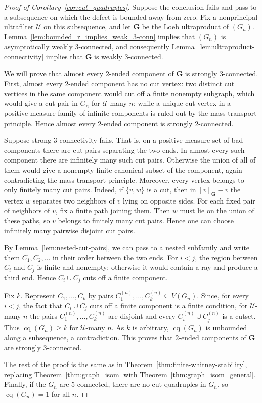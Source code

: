 \documentclass{article}
\theoremstyle{plain}
\theoremstyle{definition}
\begin{document}
\begin{proof}[Proof of Corollary~\ref{cor:cut_quadruples}]
Suppose the conclusion fails and pass to a subsequence on which the defect is bounded away from zero. Fix a nonprincipal ultrafilter $\mathcal U$ on this subsequence, and let $\mathbf G$ be the Loeb ultraproduct of $(G_n)$. Lemma~\ref{lem:bounded_r_implies_weak_3-conn} implies that $(G_n)$ is asymptotically weakly $3$-connected, and consequently Lemma~\ref{lem:ultraproduct-connectivity} implies that $\mathbf G$ is weakly $3$-connected.

We will prove that almost every $2$-ended component of $\mathbf G$ is strongly $3$-connected. First, almost every $2$-ended component has no cut vertex: two distinct cut vertices in the same component would cut off a finite nonempty subgraph, which would give a cut pair in $G_n$ for $\mathcal U$-many $n$; while a unique cut vertex in a positive-measure family of infinite components is ruled out by the mass transport principle. Hence almost every $2$-ended component is strongly $2$-connected.

Suppose strong $3$-connectivity fails. That is, on a positive-measure set of bad components there are cut pairs separating the two ends. In almost every such component there are infinitely many such cut pairs. Otherwise the union of all of them would give a nonempty finite canonical subset of the component, again contradicting the mass transport principle. Moreover, every vertex belongs to only finitely many cut pairs. Indeed, if $\{v,w\}$ is a cut, then in $[v]_{\mathbf{G}}-v$ the vertex $w$ separates two neighbors of $v$ lying on opposite sides. For each fixed pair of neighbors of $v$, fix a finite path joining them. Then $w$ must lie on the union of these paths, so $v$ belongs to finitely many cut pairs. Hence one can choose infinitely many pairwise disjoint cut pairs.

By Lemma~\ref{lem:nested-cut-pairs}, we can pass to a nested subfamily and write them $C_1,C_2,\ldots$ in their order between the two ends. For $i<j$, the region between $C_i$ and $C_j$ is finite and nonempty; otherwise it would contain a ray and produce a third end. Hence $C_i\cup C_j$ cuts off a finite component.

Fix $k$. Represent $C_1,\ldots,C_k$ by pairs $C_1^{(n)},\ldots,C_k^{(n)}\subseteq V(G_n)$. Since, for every $i<j$, the fact that $C_i\cup C_j$ cuts off a finite component is a finite condition, for $\mathcal U$-many $n$ the pairs $C_1^{(n)},\ldots,C_k^{(n)}$ are disjoint and every $C_i^{(n)}\cup C_j^{(n)}$ is a cutset. Thus $\operatorname{cq}(G_n)\ge k$ for $\mathcal U$-many $n$. As $k$ is arbitrary, $\operatorname{cq}(G_n)$ is unbounded along a subsequence, a contradiction. This proves that $2$-ended components of $\mathbf{G}$ are strongly $3$-connected.

The rest of the proof is the same as in Theorem~\ref{thm:finite-whitney-stability}, replacing Theorem~\ref{thm:graph_isom} with Theorem~\ref{thm:graph_isom_general}. Finally, if the $G_n$ are 5-connected, there are no cut quadruples in $G_n$, so $\operatorname{cq}(G_n)=1$ for all $n$.
\end{proof}
\end{document}
